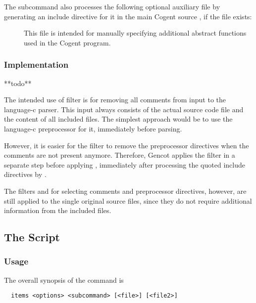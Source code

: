 The subcommand  also processes the following optional auxiliary file by generating an include directive for it in the 
main Cogent source , if the file exists:
\begin{description}
\item[] This file is intended for manually specifying additional abstract functions used 
in the Cogent program.
\end{description}

\subsubsection{Implementation}

**todo**

The intended use of filter  is for removing all comments from input to the language-c parser.
This input always consists of the actual source code file and the content of all included files. The simplest approach
would be to use the language-c preprocessor for it, immediately before parsing. 

However, it is easier for the filter  to remove the preprocessor directives when the comments are 
not present anymore. Therefore, Gencot applies the filter  in a separate step before applying
, immediately after processing the quoted include directives by .
 
The filters  and  for selecting comments and preprocessor directives, however, are
still applied to the single original source files, since they do not require additional information from the included files.


\subsection{The  Script}
\label{impl-all-items}

\subsubsection{Usage}

The overall synopsis of the  command is
\begin{verbatim}
  items <options> <subcommand> [<file>] [<file2>]
\end{verbatim}


